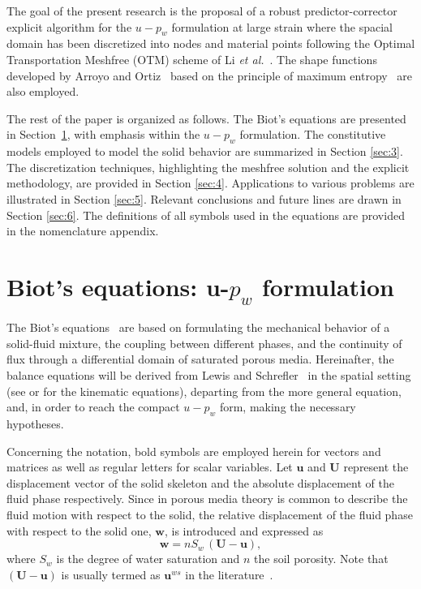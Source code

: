 \documentclass[twocolumn]{svjour3}          %
\begin{document}
The goal of the present research is the proposal of a robust predictor-corrector explicit algorithm for the $u-p_w$ formulation at large strain where the  spacial domain has been discretized into nodes and material points following the Optimal Transportation Meshfree (OTM) scheme of Li {\it et al.}~\cite{li2010}. The shape functions developed by Arroyo and Ortiz~\cite{arroyo2006} based on the principle of maximum entropy~\cite{Sukumar2004} are also employed. 

The rest of the paper is organized as follows. The Biot's equations are presented in Section~\ref{sec:2}, with emphasis within the $u-p_w$ formulation. The constitutive models employed to model the solid behavior are summarized in Section \ref{sec:3}. The discretization techniques, highlighting the meshfree solution and the explicit methodology, are provided in Section \ref{sec:4}. Applications to various problems are illustrated in Section \ref{sec:5}. Relevant conclusions and future lines are drawn in Section \ref{sec:6}. The definitions of all symbols used in the equations are provided in the nomenclature appendix.    


\section{Biot's equations: u-$p_w$ formulation}
\label{sec:2}

The Biot's equations~\cite{Biot1956} are based on formulating the mechanical behavior of a solid-fluid mixture, the coupling between different phases, and the continuity of flux through a differential domain of saturated porous media. Hereinafter, the balance equations will be derived from Lewis and Schrefler~\cite{LewisSchrefler98} in the spatial setting (see \cite{LewisSchrefler98} or \cite{Sanavia:02b,Sanavia:02} for the kinematic equations), departing from the more general equation, and, in order to reach the compact $u-p_w$ form, making the necessary hypotheses.

Concerning the notation, bold symbols are employed herein for vectors and matrices as well as regular letters for scalar variables.  Let   $\boldsymbol{u}$ and   $\boldsymbol{U}$ represent  the displacement vector of the solid skeleton   and the absolute displacement of the fluid phase respectively. Since in porous media theory is common to describe the fluid motion with respect to the solid, the
relative displacement of the fluid phase with respect to the solid one, $\boldsymbol{w}$, is introduced and expressed as~\cite{LopezQuerol2008}
\begin{equation}\label{eq_uw1}
\boldsymbol{ w }=n S_w\, \boldsymbol{  \left(U-u\right) },
\end{equation}
where $S_w$ is the degree of water saturation and $n$ the soil porosity.  Note that $\boldsymbol{  \left(U-u\right) }$ is usually  termed as $\boldsymbol{u}^{ws}$ in the literature~\cite{LewisSchrefler98}. 
\end{document}
